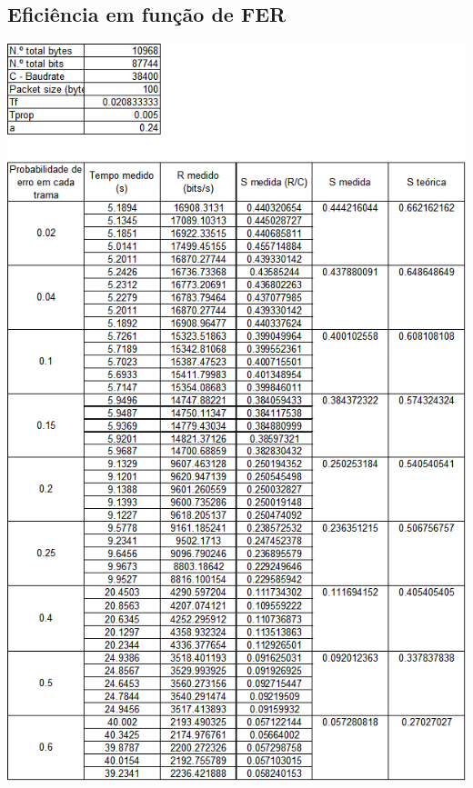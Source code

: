 \documentclass[a4paper,11pt,portuguese]{article}
\begin{document}
\subsection{Eficiência em função de FER}
\includegraphics[scale=0.8]{./imgs/graphfer.png}
\end{document}
